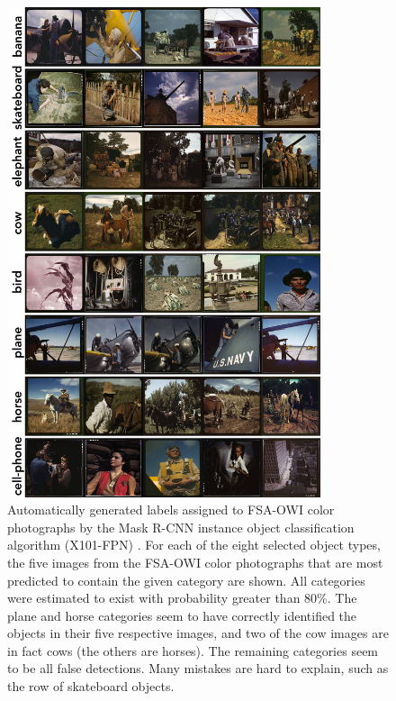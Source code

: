 \documentclass[10pt, a4paper]{article}
\begin{document}
\begin{figure}[!ht]
\begin{center}
\includegraphics[width=0.82\textwidth]{../figures/max_things_grid_labels.jpg}
\caption{Automatically generated labels assigned to FSA-OWI color photographs
by the Mask R-CNN instance object classification algorithm (X101-FPN)
\protect\cite{wu2019detectron2}. For each of the eight selected object types,
the five images from the FSA-OWI color
photographs that are most predicted to contain the given category are shown.
All categories were estimated to exist with probability greater than 80\%. The
plane and horse categories seem to have correctly identified the objects in
their five respective images, and two of the cow images are in fact cows
(the others are horses). The remaining categories seem to be all false
detections. Many mistakes are hard to explain, such as the row of skateboard
objects.
}
\label{fig:things}
\end{center}
\end{figure}
\end{document}
